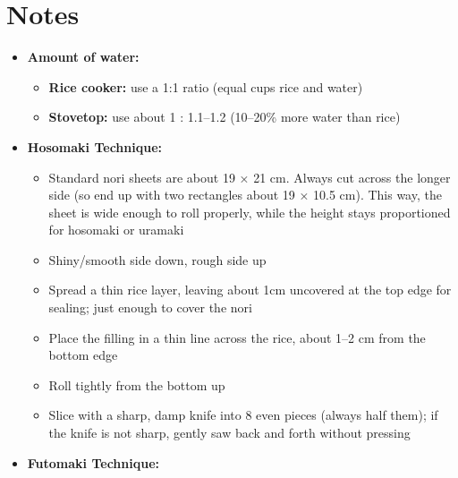 \documentclass[landscape, a4paper]{article}
\newcommand\alert[1]{\textcolor{PrimaryColor}{\textbf{#1}}}
\begin{document}
\begin{minipage}[t]{0.31\textwidth}
	\vspace{0.5cm}
	\setlength{\parskip}{0.25cm}

	\section*{Notes}
	\begin{itemize}
		\item \alert{Amount of water:}
		\begin{itemize}
			\item \alert{Rice cooker:} use a 1:1 ratio (equal cups rice and water)
			\item \alert{Stovetop:} use about 1 : 1.1–1.2 (10–20\% more water than rice)
		\end{itemize}
		\item \alert{Hosomaki Technique:}
		\begin{itemize}
			\item Standard nori sheets are about 19 × 21 cm. Always cut across the longer side (so end up with two rectangles about 19 × 10.5 cm). This way, the sheet is wide enough to roll properly, while the height stays proportioned for hosomaki or uramaki
			\item Shiny/smooth side down, rough side up
			\item Spread a thin rice layer, leaving about 1cm uncovered at the top edge for sealing; just enough to cover the nori
			\item Place the filling in a thin line across the rice, about 1–2 cm from the bottom edge
			\item Roll tightly from the bottom up
			\item Slice with a sharp, damp knife into 8 even pieces (always half them); if the knife is not sharp, gently saw back and forth without pressing
		\end{itemize}
		\item \alert{Futomaki Technique:}
		\begin{itemize}

\end{itemize}
\end{itemize}
\end{minipage}
\end{document}
